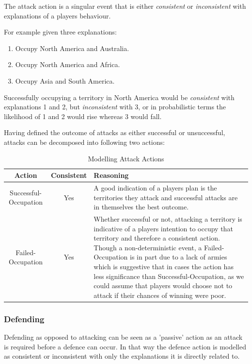 \documentclass[parskip]{cs4rep}
\begin{document}
The attack action is a singular event that is either \textit{consistent} or \textit{inconsistent} with explanations of a players behaviour. 

For example given three explanations:

\begin{enumerate}
\item
Occupy North America and Australia.
\item
Occupy North America and Africa.
\item
Occupy Asia and South America.
\end{enumerate}

Successfully occupying a territory in North America would be \textit{consistent} with explanations 1 and 2, but \textit{inconsistent} with 3, or in probabilistic terms the likelihood of 1 and 2 would rise whereas 3 would fall.

Having defined the outcome of attacks as either successful or unsuccessful, attacks can be decomposed into following two actions: 

\begin{table}[ht]
\centering
\begin{tabular}{|c|c|p{8cm}|}
\hline 
\textbf{Action} & \textbf{Consistent}  & \textbf{Reasoning} \\ 
\hline 
Successful-Occupation & Yes & A good indication of a players plan is the territories they attack and successful attacks are in themselves the best outcome. \\ 
\hline 
Failed-Occupation & Yes & Whether successful or not, attacking a territory is indicative of a players intention to occupy that territory and therefore a consistent action. Though a non-deterministic event, a Failed-Occupation is in part due to a lack of armies which is suggestive that in cases the action has less significance than Successful-Occupation, as we could assume that players would choose not to attack if their chances of winning were poor.\\ 
\hline
\end{tabular}
\caption{Modelling Attack Actions}
\label{table:attack-modelling}
\end{table}

\newpage

\subsubsection{Defending}

Defending as opposed to attacking can be seen as a 'passive' action as an attack is required before a defence can occur. In that way the defence action is modelled as consistent or inconsistent with only the explanations it is directly related to. 
\end{document}
